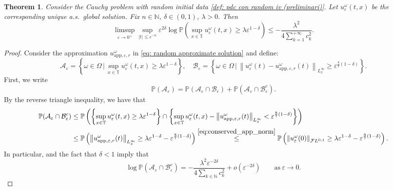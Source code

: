 \documentclass[a4paper,10pt,reqno]{article}
\theoremstyle{definition}
\theoremstyle{plain}
\newtheorem{theorem}[definition]{Theorem}
\theoremstyle{plain}
\theoremstyle{definition}
\theoremstyle{plain}
\theoremstyle{plain}
\theoremstyle{plain}
\theoremstyle{definition}
\theoremstyle{definition}
\newcommand{\norm}[1]{\left\lVert #1 \right\rVert}
\def \N{\mathbb N}
\def \P{{\mathbb P}}
\def \T{\mathbb{T}}
\def \A{\mathcal{A}}
\def \FL{\mathcal{F}L}
\def \B{\mathcal{B}}
\begin{document}
\begin{theorem} \label{thm: almost global ldp}
Consider the Cauchy problem with random initial data \eqref{def: pdc con random iv (preliminari)}.
Let $u_{\varepsilon}^{\omega}(t,x)$ be the corresponding unique a.s.\ global solution.
Fix $n \in \N$, $\delta \in (0,1)$, $\lambda > 0$. Then
\begin{equation}\label{eq:limsup}
\limsup_{\varepsilon \to 0^{+}} \sup_{|t|\leq \varepsilon^{-n}} \varepsilon^{2\delta} \log \P \left( \sup_{x \in \T} u_{\varepsilon}^{\omega}(t,x) \ge \lambda \varepsilon^{1-\delta} \right) \le - \frac{\lambda^2}{4 \sum_{k=1}^{+\infty} c_k^2}.
\end{equation}
\end{theorem}
\begin{proof}
Consider the approximation $u_{\mathrm{app},\varepsilon,r}^{\omega}$ in \eqref{eq: random approximate solution} and define:
\[
\mathcal A_{\varepsilon}  = \left \{ \omega \in \mathbb{\Omega} \, | \,  \sup_{x\in\T} u_{\varepsilon}^{\omega}(t,x) \ge \lambda \varepsilon^{1-\delta} \right \}, \quad
\mathcal B_{\varepsilon}  = \left \{ \omega \in \mathbb{\Omega} \, | \,  \norm{u_{\varepsilon}^{\omega}(t) - u_{\mathrm{app},\varepsilon,r}^{\omega}(t)}_{L_x^{\infty}} \ge \varepsilon^{\frac{8}{7} (1-\delta)} \right \}.
\]
First, we write
\begin{equation}\label{eq:intersection0}
\P(\A_{\varepsilon}) = \P(\A_{\varepsilon}\cap \B_{\varepsilon})+\P(\A_{\varepsilon}\cap \B_{\varepsilon}^c).
\end{equation}
By the reverse triangle inequality, we have that
\[
\begin{split}
\P( \A_{\varepsilon} \cap \B_{\varepsilon}^c) 
& \le \P \left( \left \{  \sup_{x\in\T} u_{\varepsilon}^{\omega}(t,x) \ge \lambda \varepsilon^{1-\delta} \right \} \cap \left \{  \sup_{x\in\T} u_{\varepsilon}^{\omega}(t,x)- \norm{u_{\mathrm{app},\varepsilon,r}^{\omega}(t)}_{L_x^{\infty}} < \varepsilon^{\frac{8}{7}(1-\delta)} \right \} \right) \\
& \le \P \left( \norm{u_{\mathrm{app},\varepsilon,r}^{\omega}(t)}_{L_x^{\infty}} \ge \lambda \varepsilon^{1-\delta} - \varepsilon^{\frac{8}{7}(1-\delta)} \right)\stackrel{\eqref{eq:conserved_app_norm}}{\leq} \P \left( \norm{u_{\varepsilon}^{\omega}(0)}_{\FL^{0,1}} \ge \lambda \varepsilon^{1-\delta} - \varepsilon^{\frac{8}{7}(1-\delta)} \right).
\end{split}
\]
In particular,  and the fact that $\delta<1$ imply that
\begin{equation}\label{eq:intersection1}
    \log \P( \A_{\varepsilon} \cap \B_{\varepsilon}^c) = -\frac{\lambda^2 \varepsilon^{-2\delta}}{4\sum_{k\in\N} c_k^2} + o(\varepsilon^{-2\delta}) \qquad \mbox{as}\ \varepsilon\rightarrow 0.
\end{equation}


\end{proof}
\end{document}
